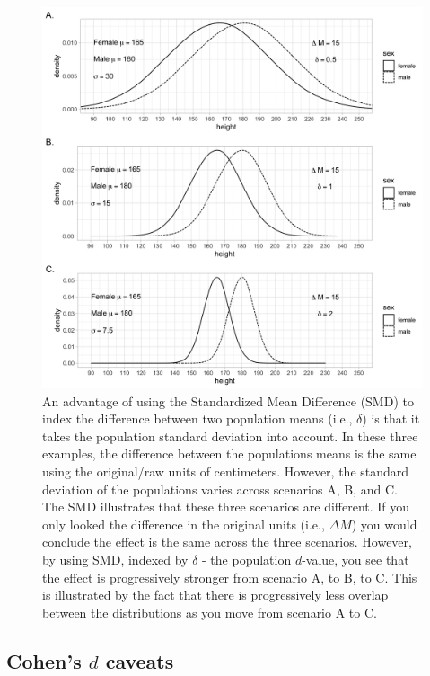 \documentclass[
]{krantz}
\begin{document}
\begin{figure}
\includegraphics[width=1\linewidth]{ch_populations/images/dvalue_ex2} \caption{An advantage of using the Standardized Mean Difference (SMD) to index the difference between two population means (i.e., $\delta$) is that it takes the population standard deviation into account. In these three examples, the difference between the populations means is the same using the original/raw units of centimeters. However, the standard deviation of the populations varies across scenarios A, B, and C. The SMD illustrates that these three scenarios are different. If you only looked the difference in the original units (i.e., $\Delta M$) you would conclude the effect is the same across the three scenarios. However, by using SMD, indexed by $\delta$ - the population $d$-value, you see that the effect is progressively stronger from scenario A, to B, to C. This is illustrated by the fact that there is progressively less overlap between the distributions as you move from scenario A to C.}\label{fig:dex2}
\end{figure}

\hypertarget{cohens-d-caveats}{%
\subsection{\texorpdfstring{Cohen's \(d\) caveats}{Cohen's d caveats}}\label{cohens-d-caveats}}
\end{document}
